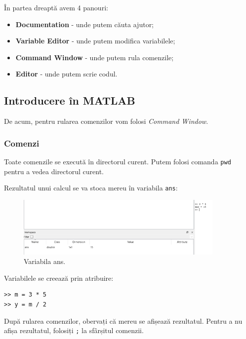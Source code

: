 \documentclass{exam}
\begin{document}
\par În partea dreaptă avem 4 panouri:

\begin{itemize}
	\item \textbf{Documentation} - unde putem căuta ajutor;
	\item \textbf{Variable Editor} - unde putem modifica variabilele;
	\item \textbf{Command Window} - unde putem rula comenzile;
	\item \textbf{Editor} - unde putem scrie codul.
\end{itemize}

\subsection{Introducere în MATLAB}

\par De acum, pentru rularea comenzilor vom folosi \textit{Command Window}.

\subsubsection{Comenzi}

\par Toate comenzile se execută în directorul curent. Putem folosi comanda \verb|pwd|
pentru a vedea directorul curent.

\newpage
\par Rezultatul unui calcul se va stoca mereu în variabila \verb|ans|:

\begin{figure}[ht]
	\centering
	\includegraphics[width=0.9\textwidth]{ans}
	\caption{Variabila ans.}
\end{figure}

\par Variabilele se creează prin atribuire:

\begin{lstlisting}
>> m = 3 * 5
>> y = m / 2
\end{lstlisting}

\par După rularea comenzilor, obervați că mereu se afișează rezultatul. Pentru a
nu afișa rezultatul, folosiți \verb|;| la sfârșitul comenzii.
\end{document}
